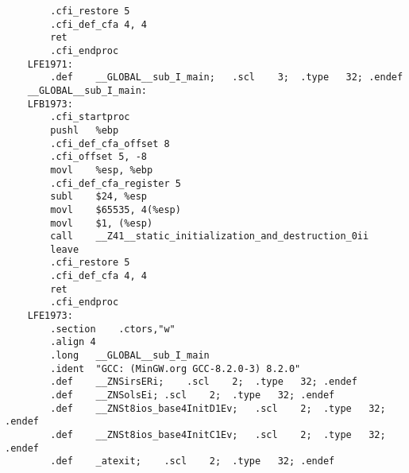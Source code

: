 \documentclass[UTF8]{ctexart}
\begin{document}
\begin{verbatim}
        .cfi_restore 5
        .cfi_def_cfa 4, 4
        ret
        .cfi_endproc
    LFE1971:
        .def	__GLOBAL__sub_I_main;	.scl	3;	.type	32;	.endef
    __GLOBAL__sub_I_main:
    LFB1973:
        .cfi_startproc
        pushl	%ebp
        .cfi_def_cfa_offset 8
        .cfi_offset 5, -8
        movl	%esp, %ebp
        .cfi_def_cfa_register 5
        subl	$24, %esp
        movl	$65535, 4(%esp)
        movl	$1, (%esp)
        call	__Z41__static_initialization_and_destruction_0ii
        leave
        .cfi_restore 5
        .cfi_def_cfa 4, 4
        ret
        .cfi_endproc
    LFE1973:
        .section	.ctors,"w"
        .align 4
        .long	__GLOBAL__sub_I_main
        .ident	"GCC: (MinGW.org GCC-8.2.0-3) 8.2.0"
        .def	__ZNSirsERi;	.scl	2;	.type	32;	.endef
        .def	__ZNSolsEi;	.scl	2;	.type	32;	.endef
        .def	__ZNSt8ios_base4InitD1Ev;	.scl	2;	.type	32;	.endef
        .def	__ZNSt8ios_base4InitC1Ev;	.scl	2;	.type	32;	.endef
        .def	_atexit;	.scl	2;	.type	32;	.endef
    
    \end{verbatim}
\end{document}
